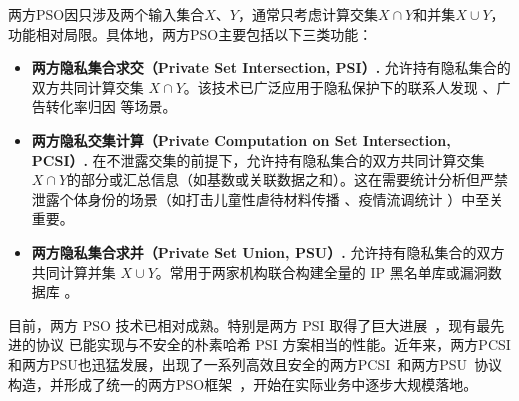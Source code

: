 两方PSO因只涉及两个输入集合$X$、$Y$，通常只考虑计算交集$X \cap Y$和并集$X \cup Y$，功能相对局限。具体地，两方PSO主要包括以下三类功能：
\begin{itemize}
    \item \textbf{两方隐私集合求交（Private Set Intersection, PSI）.} 允许持有隐私集合的双方共同计算交集 $X \cap Y$。该技术已广泛应用于隐私保护下的联系人发现 \cite{NTLHB-NDSS-2011}、广告转化率归因 \cite{Ion-EUROSP-2020} 等场景。

    \item \textbf{两方隐私交集计算（Private Computation on Set Intersection, PCSI）.} 在不泄露交集的前提下，允许持有隐私集合的双方共同计算交集 $X \cap Y$的部分或汇总信息（如基数或关联数据之和）。这在需要统计分析但严禁泄露个体身份的场景（如打击儿童性虐待材料传播 \cite{BBM21}、疫情流调统计 \cite{BBV20}）中至关重要。

    \item \textbf{两方隐私集合求并（Private Set Union, PSU）.} 允许持有隐私集合的双方共同计算并集 $X \cup Y$。常用于两家机构联合构建全量的 IP 黑名单库或漏洞数据库 \cite{HLSSSYY16}。
\end{itemize}
目前，两方 PSO 技术已相对成熟。特别是两方 PSI 取得了巨大进展~\cite{PSZ-USENIX-2014,KKRT-CCS-2016,PRTY-CRYPTO-2019,CM-CRYPTO-2020,PRTY20,RS-EUROCRYPT-2021,RR-CCS-2022}，现有最先进的协议 \cite{RR-CCS-2022} 已能实现与不安全的朴素哈希 PSI 方案相当的性能。近年来，两方PCSI和两方PSU也迅猛发展，出现了一系列高效且安全的两方PCSI~\cite{GMRSS-PKC-2021,ZCZDL-2024}和两方PSU~\cite{KRTW-ASIACRYPT-2019,GMRSS-PKC-2021,Jia-USENIX-2022,ZCLZL-USENIX-2023,ZCZDL-2024,Jia0ZG24}协议构造，并形成了统一的两方PSO框架~\cite{ZCZDL-2024}，开始在实际业务中逐步大规模落地。

